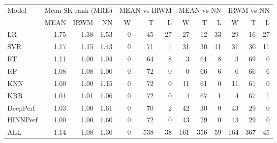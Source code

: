 \begin{tabular}{lrrrrrrrrrrrr}
\toprule
Model & \multicolumn{3}{c}{Mean SK rank (MRE)} & \multicolumn{3}{c}{MEAN vs IRWM} & \multicolumn{3}{c}{MEAN vs NN} & \multicolumn{3}{c}{IRWM vs NN} \\
 & MEAN & IRWM & NN & W & T & L & W & T & L & W & T & L \\
\midrule
LR & 1.75 & 1.38 & 1.53 & 0 & 45 & 27 & 27 & 12 & 33 & 29 & 16 & 27 \\
SVR & 1.17 & 1.15 & 1.43 & 0 & 71 & 1 & 31 & 30 & 11 & 31 & 30 & 11 \\
RT & 1.11 & 1.00 & 1.04 & 0 & 64 & 8 & 3 & 61 & 8 & 3 & 69 & 0 \\
RF & 1.08 & 1.08 & 1.00 & 0 & 72 & 0 & 0 & 66 & 6 & 0 & 66 & 6 \\
KNN & 1.00 & 1.00 & 1.15 & 0 & 72 & 0 & 11 & 61 & 0 & 11 & 61 & 0 \\
KRR & 1.01 & 1.01 & 1.06 & 0 & 72 & 0 & 4 & 67 & 1 & 4 & 67 & 1 \\
DeepPerf & 1.03 & 1.00 & 1.61 & 0 & 70 & 2 & 42 & 30 & 0 & 43 & 29 & 0 \\
HINNPerf & 1.00 & 1.00 & 1.60 & 0 & 72 & 0 & 43 & 29 & 0 & 43 & 29 & 0 \\
ALL & 1.14 & 1.08 & 1.30 & 0 & 538 & 38 & 161 & 356 & 59 & 164 & 367 & 45 \\
\bottomrule
\end{tabular}
